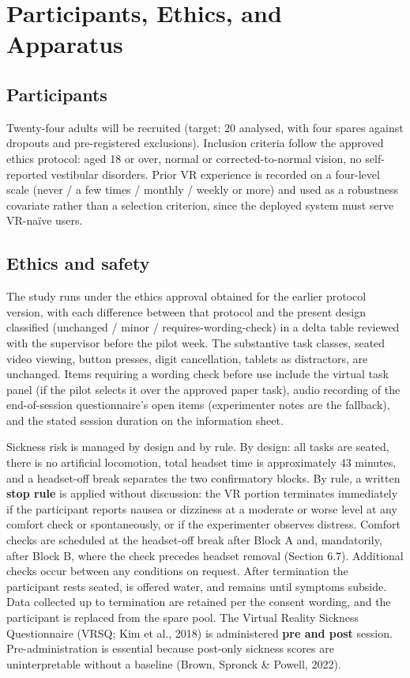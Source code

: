 \section{Participants, Ethics, and Apparatus}

\subsection{Participants}

Twenty-four adults will be recruited (target: 20 analysed, with four spares against dropouts and
pre-registered exclusions). Inclusion criteria follow the approved ethics protocol: aged 18 or over,
normal or corrected-to-normal vision, no self-reported vestibular disorders. Prior VR experience is
recorded on a four-level scale (never / a few times / monthly / weekly or more) and used as a
robustness covariate rather than a selection criterion, since the deployed system must serve VR-naïve
users.

\subsection{Ethics and safety}

The study runs under the ethics approval obtained for the earlier protocol version, with each
difference between that protocol and the present design classified (unchanged / minor /
requires-wording-check) in a delta table reviewed with the supervisor before the pilot week. The
substantive task classes, seated video viewing, button presses, digit cancellation, tablets as
distractors, are unchanged. Items requiring a wording check before use include the virtual
task panel (if the pilot selects it over the approved paper task), audio recording of the
end-of-session questionnaire's open items (experimenter notes are the fallback), and the stated
session duration on the information sheet.

Sickness risk is managed by design and by rule. By design: all tasks are seated, there is no
artificial locomotion, total headset time is approximately 43 minutes, and a headset-off break separates the
two confirmatory blocks. By rule, a written \textbf{stop rule} is applied without discussion: the VR
portion terminates immediately if the participant reports nausea or dizziness at a moderate or worse
level at any comfort check or spontaneously, or if the experimenter observes distress. Comfort checks
are scheduled at the headset-off break after Block A and, mandatorily, after Block B, where the
check precedes headset removal (Section 6.7). Additional checks occur between any conditions
on request. After termination the participant rests seated, is offered water, and remains until
symptoms subside. Data collected up to termination are retained per the consent wording, and the
participant is replaced from the spare pool. The Virtual Reality Sickness Questionnaire (VRSQ; Kim et
al., 2018) is administered \textbf{pre and post} session. Pre-administration is essential because
post-only sickness scores are uninterpretable without a baseline (Brown, Spronck \& Powell, 2022).

